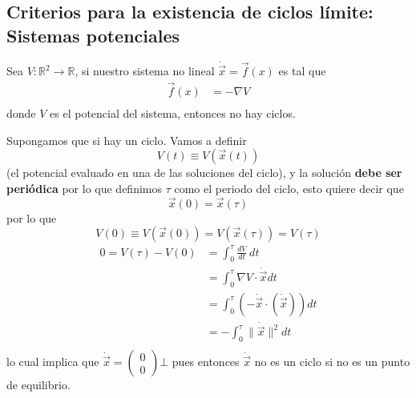 \subsection{Criterios para la existencia de ciclos límite: Sistemas potenciales}

\begin{tcolorbox}[colback=Black!4,colframe=White, arc=2mm]
\begin{teorema}
Sea $V: \mathbb{R}^2 \to \mathbb{R} $, si nuestro sistema no lineal $\dot{\vec{x}}=\vec{f}(x)$ es tal que $$
    \begin{aligned}
      \vec{f}(x) &= -\nabla V  \\  
    \end{aligned}
    $$
    donde $V$ es el potencial del sistema, entonces no hay ciclos.     \\
\end{teorema}
\end{tcolorbox}

\begin{tcolorbox}[colback=Black!4, colframe=White, arc=2mm]
\begin{demostracion} 
  Supongamos que si hay un ciclo.  
    Vamos a definir $$V(t) \equiv V(\vec{x}(t))$$ (el potencial evaluado en una de las soluciones del ciclo), y la solución \textbf{debe ser periódica} por lo que definimos $\tau$ como el periodo del ciclo, esto quiere decir que $$
    \vec{x}(0) = \vec{x}(\tau)
    $$
    por lo que $$
    V(0) \equiv V(\vec{x}(0)) = V(\vec{x}(\tau)) = V(\tau)$$
    $$
    \begin{aligned}
      0 = V(\tau) - V(0) &= \int_{{0}}^{{\tau}} {\frac{dV}{dt}} \: d{t} \\
		      &= \int_{0}^{\tau} {\nabla V \cdot \dot{\vec{x}}}  d{t}   \\
                      &= \int_{0}^{\tau} (-\dot{\vec{x}}\cdot(\dot{\vec{x}})) d{t}  \\
                      &= -\int_{0}^{\tau} \|\dot{\vec{x}}\|^2 d{t} \\ 
    \end{aligned}
    $$
    lo cual implica que $\dot{\vec{x}}=\begin{pmatrix} 0 \\ 0 \end{pmatrix} \bot$ pues entonces $\dot{\vec{x}}$ no es un ciclo si no es un punto de equilibrio.     
\end{demostracion}
\end{tcolorbox}
    

